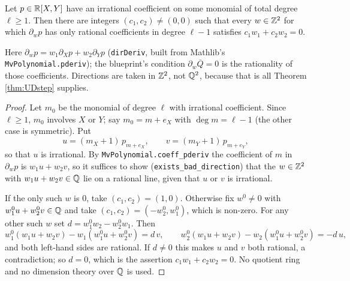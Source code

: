 \begin{lemma}
  \label{lem:badDirections}
  \leanok
  Let $p \in \mathbb{R}[X,Y]$ have an irrational coefficient on some monomial of total
  degree $\ell \geq 1$. Then there are integers $(c_1,c_2) \neq (0,0)$ such
  that every $w \in \mathbb{Z}^2$ for which $\partial_w p$ has only rational
  coefficients in degree $\ell - 1$ satisfies $c_1w_1 + c_2w_2 = 0$.

  Here $\partial_w p = w_1 \partial_X p + w_2 \partial_Y p$
  (\texttt{dirDeriv}, built from Mathlib's \texttt{MvPolynomial.pderiv}); the
  blueprint's condition $\partial_w \overline{Q} = 0$ is the rationality of
  those coefficients. Directions are taken in $\mathbb{Z}^2$, not $\mathbb{Q}^2$, because that
  is all Theorem \ref{thm:UDstep} supplies.
\end{lemma}
\begin{proof}
  \leanok
  Let $m_0$ be the monomial of degree $\ell$ with irrational coefficient. Since
  $\ell \geq 1$, $m_0$ involves $X$ or $Y$; say $m_0 = m + e_X$ with
  $\deg m = \ell - 1$ (the other case is symmetric). Put
  \[
    u = (m_X + 1)\,p_{m + e_X}, \qquad v = (m_Y + 1)\,p_{m + e_Y},
  \]
  so that $u$ is irrational. By \texttt{MvPolynomial.coeff\_pderiv} the
  coefficient of $m$ in $\partial_w p$ is $w_1 u + w_2 v$, so it suffices to
  show (\texttt{exists\_bad\_direction}) that the $w \in \mathbb{Z}^2$ with
  $w_1u + w_2v \in \mathbb{Q}$ lie on a rational line, given that $u$ or $v$ is
  irrational.

  If the only such $w$ is $0$, take $(c_1,c_2) = (1,0)$. Otherwise fix
  $w^0 \neq 0$ with $w^0_1u + w^0_2v \in \mathbb{Q}$ and take
  $(c_1,c_2) = (-w^0_2, w^0_1)$, which is non-zero. For any other such $w$ set
  $d = w^0_1w_2 - w^0_2w_1$. Then
  \[
    w^0_1(w_1u + w_2v) - w_1(w^0_1u + w^0_2v) = d\,v, \qquad
    w^0_2(w_1u + w_2v) - w_2(w^0_1u + w^0_2v) = -d\,u ,
  \]
  and both left-hand sides are rational. If $d \neq 0$ this makes $u$ and $v$
  both rational, a contradiction; so $d = 0$, which is the assertion
  $c_1w_1 + c_2w_2 = 0$. No quotient ring and no dimension theory over $\mathbb{Q}$ is
  used.
\end{proof}

